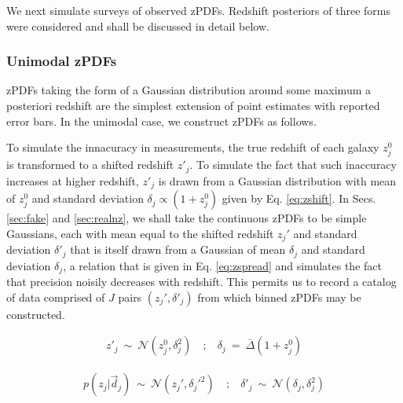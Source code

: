\documentclass[preprint]{aastex}
\begin{document}

We next simulate surveys of observed zPDFs.  Redshift posteriors of three forms were considered and shall be discussed in detail below.  

\subsubsection{Unimodal zPDFs}
\label{sec:unimodal}

zPDFs taking the form of a Gaussian distribution around some maximum a posteriori redshift are the simplest extension of point estimates with reported error bars.  In the unimodal case, we construct zPDFs as follows.

To simulate the innacuracy in measurements, the true redshift of each galaxy $z_{j}^{0}$ is transformed to a shifted redshift $z'_{j}$.  To simulate the fact that such inaccuracy increases at higher redshift, $z'_{j}$ is drawn from a Gaussian distribution with mean of $z_{j}^{0}$ and standard deviation $\delta_{j}\propto(1+z_{j}^{0})$ given by Eq. \ref{eq:zshift}.  In Secs. \ref{sec:fake} and \ref{sec:realnz}, we shall take the continuous zPDFs to be simple Gaussians, each with mean equal to the shifted redshift $z_{j}'$ and standard deviation $\delta'_{j}$ that is itself drawn from a Gaussian of mean $\delta_{j}$ and standard deviation $\delta_{j}$, a relation that is given in Eq. \ref{eq:zspread} and simulates the fact that precision noisily decreases with redshift.  This permits us to record a catalog of data comprised of $J$ pairs $(z_{j}',\delta'_{j})$ from which binned zPDFs may be constructed.  %

\begin{eqnarray}
\label{eq:zshift}
z'_{j}\ \sim\ \mathcal{N}(z_{j}^{0},\delta_{j}^{2})\ &;&\ \delta_{j}\ =\ \bar{\Delta}(1+z^{0}_{j})
\end{eqnarray}

\begin{eqnarray}
\label{eq:zspread}
p(z_{j}|\vec{d}_{j})\ \sim\ \mathcal{N}(z_{j}',\delta_{j}'^{2})\ &;&\ \delta'_{j}\ \sim\ \mathcal{N}(\delta_{j},\delta_{j}^{2})
\end{eqnarray}
\end{document}
